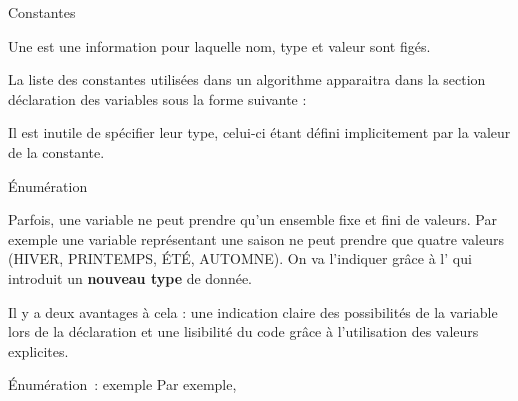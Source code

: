 \begin{frame}{Constantes}

	Une  est une information pour laquelle nom, type et
	valeur sont figés. 
	
	La liste des constantes utilisées dans un algorithme
	apparaitra dans la section déclaration des variables sous la forme
	suivante :

	\bigskip
	

	\bigskip
	
	Il est inutile de spécifier leur type, celui-ci
	étant défini implicitement par la valeur de la constante.
\end{frame}

\begin{frame}{Énumération}

	Parfois, une variable ne peut prendre qu'un ensemble
	fixe et fini de valeurs. Par exemple une variable représentant une
	saison ne peut prendre que quatre valeurs (HIVER, PRINTEMPS, ÉTÉ,
	AUTOMNE). On va l'indiquer grâce à
	l' qui introduit un \textbf{nouveau type}
	de donnée.

	\bigskip
	

	\bigskip
	
	Il y a deux avantages à cela : une indication claire des possibilités de
	la variable lors de la déclaration et une lisibilité du code grâce à
	l'utilisation des valeurs explicites.
\end{frame}

\begin{frame}[allowframebreaks]{Énumération~: exemple}
	Par exemple, 
		
\end{frame}


